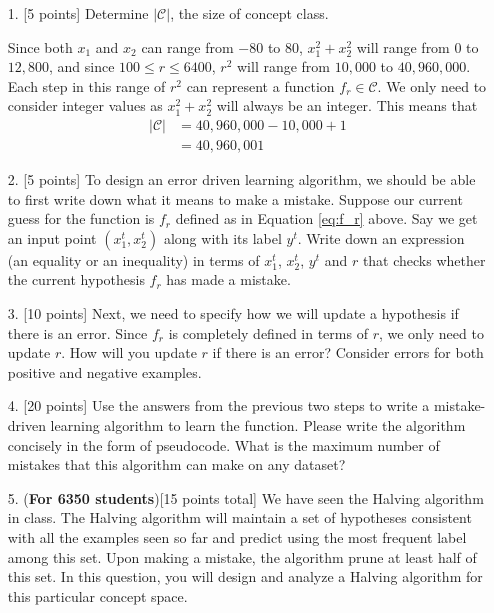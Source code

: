 \begin{enumerate}


\item[1.] [5 points] Determine $|\mathcal{C}|$, the size of concept
  class.
  
  Since both $x_1$ and $x_2$ can range from $-80$ to $80$, $x_1^2 + x_2^2$ will range from $0$ to $12,800$, and since $100 \leq r \leq 6400$, $r^2$ will range from $10,000$ to $40,960,000$. Each step in this range of $r^2$ can represent a function $f_r \in \mathcal{C}$. We only need to consider integer values as $x_1^2 + x_2^2$ will always be an integer. This means that
  \begin{equation*}
  \begin{split}
  |\mathcal{C}| &= 40,960,000 - 10,000 + 1\\
  &= 40,960,001
  \end{split} 
  \end{equation*}
  
\item[2.] [5 points] To design an error driven learning algorithm, we
  should be able to first write down what it means to make a mistake.
  Suppose our current guess for the function is $f_r$ defined as in
  Equation \ref{eq:f_r} above. Say we get an input point $(x_1^t,
  x_2^t)$ along with its label $y^t$. Write down an expression (an
  equality or an inequality) in terms of $x_1^t$, $x_2^t$, $y^t$ and
  $r$ that checks whether the current hypothesis $f_r$ has made a
  mistake.

\item[3.] [10 points] Next, we need to specify how we will update a
  hypothesis if there is an error. Since $f_r$ is completely defined
  in terms of $r$, we only need to update $r$. How will you update $r$
  if there is an error? Consider errors for both positive and negative
  examples.

\item[4.] [20 points] Use the answers from the previous two steps to
  write a mistake-driven learning algorithm to learn the function.
  Please write the algorithm concisely in the form of pseudocode. What
  is the maximum number of mistakes that this algorithm can make on
  any dataset?

\item[5.] ({\bf For 6350 students})[15 points total] We have seen the
  Halving algorithm in class. The Halving algorithm will maintain a
  set of hypotheses consistent with all the examples seen so far and
  predict using the most frequent label among this set. Upon making a
  mistake, the algorithm prune at least half of this set. In this
  question, you will design and analyze a Halving algorithm for this
  particular concept space.


\end{enumerate}
